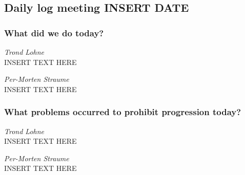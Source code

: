 \documentclass{article}
\begin{document}
\begin{center}
\subsection*{Daily log meeting INSERT DATE}
\end{center}
\bigskip


\subsubsection*{What did we do today?}

\noindent\textit{Trond Lohne}\\
INSERT TEXT HERE

\medskip

\noindent\textit{Per-Morten Straume}\\
INSERT TEXT HERE


\subsubsection*{What problems occurred to prohibit progression today?}

\noindent\textit{Trond Lohne}\\
INSERT TEXT HERE

\medskip

\noindent\textit{Per-Morten Straume}\\
INSERT TEXT HERE
\end{document}
